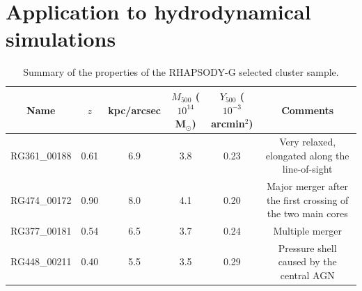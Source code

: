 \documentclass[twocolumn,traditabstract]{aa}
\begin{document}
\section{Application to hydrodynamical simulations}\label{sec:Application_to_hydrodynamical_simulations}
\begin{table}[]
\caption{\footnotesize{Summary of the properties of the RHAPSODY-G selected cluster sample.}}
\begin{center}
\begin{tabular}{c|c|c|c|c|c}
\hline
\hline
Name & $z$ & kpc/arcsec & $M_{500}$ ($10^{14}$ M$_{\odot}$)& $Y_{500}$ ($10^{-3}$arcmin$^2$) & Comments \\
\hline
RG361\_00188 & 0.61 & 6.9 & 3.8 & 0.23 & Very relaxed, elongated along the line-of-sight \\ 
RG474\_00172 & 0.90 & 8.0 & 4.1 & 0.20 & Major merger after the first crossing of the two main cores \\ 
RG377\_00181 & 0.54 & 6.5 & 3.7 & 0.24 & Multiple merger \\
RG448\_00211 & 0.40 & 5.5 & 3.5 & 0.29 & Pressure shell caused by the central AGN \\ 
\hline
\end{tabular}
\end{center}
\label{tab:rhapsody_summary}
\end{table}
\end{document}

